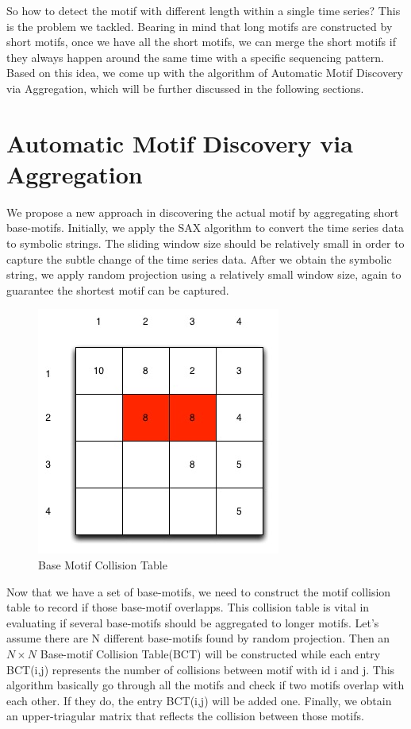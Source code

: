 \documentclass{article}
\begin{document}
So how to detect the motif with different length within a single time series? This is the problem we tackled. Bearing in mind that long motifs are constructed by short motifs, once 
we have all the short motifs, we can merge the short motifs if they always happen around the same time with a specific sequencing pattern. Based on this idea, we come up with 
the algorithm of Automatic Motif Discovery via Aggregation, which will be further discussed in the following sections. 

\section{Automatic Motif Discovery via Aggregation}
We propose a new approach in discovering the actual motif by aggregating short base-motifs. 
Initially, we apply the SAX algorithm to convert the time series data to symbolic strings. 
The sliding window size should be relatively small in order to capture the subtle change of the time 
series data. After we obtain the symbolic string, we apply random projection using a relatively 
small window size, again to guarantee the shortest motif can be captured. 

\begin{figure}
  \centering
  \includegraphics[scale=0.3]{BCT}
  \caption{Base Motif Collision Table}
\end{figure}

Now that we have a set of base-motifs, we need to construct the motif collision table to record if those base-motif overlapps. 
This collision table is vital in evaluating if several base-motifs should be aggregated to longer motifs. 
Let's assume there are N different base-motifs found by random projection. Then an $N \times N$ Base-motif Collision Table(BCT)
will be constructed while each entry BCT(i,j) represents the number of collisions between motif with id i and j. 
This algorithm basically go through all the motifs and check if two motifs overlap with each other. If they do, 
the entry BCT(i,j) will be added one. Finally, we obtain an upper-triagular matrix that reflects the collision between those motifs. 
\end{document}
